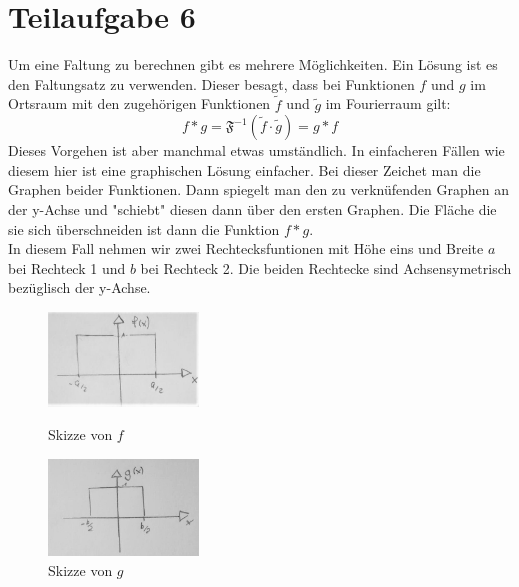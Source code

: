

\section{Teilaufgabe 6}

Um eine Faltung zu berechnen gibt es mehrere Möglichkeiten. Ein Lösung ist es den Faltungsatz zu verwenden. Dieser besagt, dass bei Funktionen $f$ und $g$ im Ortsraum mit den 
zugehörigen Funktionen $\tilde{f}$ und $\tilde{g}$ im Fourierraum gilt:
\begin{equation}  \label{faltungssatz}
    f\ast g = \mathfrak{F}^{-1}(\tilde{f} \cdot \tilde{g}  ) = g \ast f
\end{equation}
Dieses Vorgehen ist aber manchmal etwas umständlich. In einfacheren Fällen wie diesem hier ist eine graphischen Lösung einfacher. 
Bei dieser Zeichet man die Graphen beider Funktionen. Dann spiegelt man den zu verknüfenden Graphen an der y-Achse und "schiebt" diesen dann über den ersten Graphen. 
Die Fläche die sie sich überschneiden ist dann die Funktion $f \ast g $.\\
In diesem Fall nehmen wir zwei Rechtecksfuntionen mit Höhe eins und Breite $a$ bei Rechteck 1 und $b$ bei Rechteck 2. Die beiden Rechtecke sind Achsensymetrisch bezüglisch der y-Achse.
\begin{figure}[htb]
    \centering
        \begin{minipage}[t]{0.45\linewidth}
            \centering
            \includegraphics[width=4cm]{Bilder/FzV/frage6_1.jpg}
            \caption{Skizze von $f$}
        \end{minipage}
        \hfill
        \begin{minipage}[t]{0.45\linewidth}
            \centering
            \includegraphics[width=4cm]{Bilder/FzV/frage6_2.jpg}
            \caption{Skizze von $g$}
        \end{minipage}
   
    
\end{figure}
